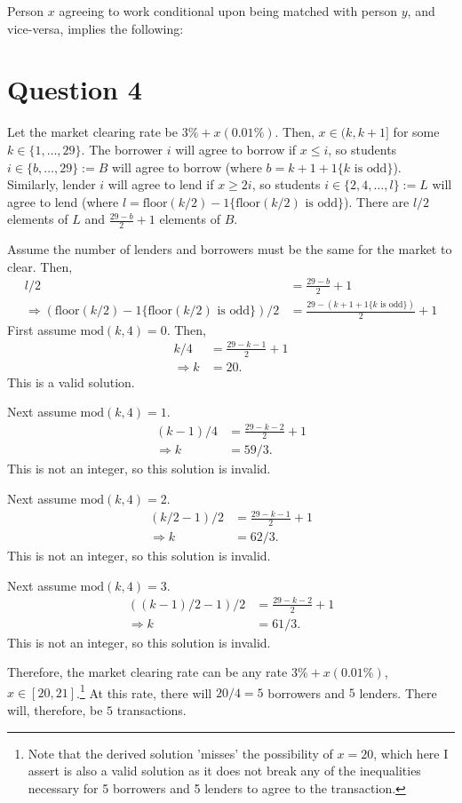 \documentclass[11pt]{article} %
\begin{document}
Person $x$ agreeing to work conditional upon being matched with person $y$, and vice-versa, implies the following:


\section{Question 4}
Let the market clearing rate be  $3\%+x(0.01\%)$. Then, $x\in (k,k+1]$ for some $k \in \{1,\dots,29\}$. The borrower $i$ will agree to borrow if $x\leq i$, so students $i \in \{b, \dots, 29\}:= B$ will agree to borrow (where $b= k +1 + 1\{k \text{ is odd}\}$). Similarly, lender $i$ will agree to lend if $x\geq 2i$, so students $i \in \{2,4,\dots,l\}:= L$ will agree to lend (where $l = \text{floor}(k/2) - 1\{ \text{floor}(k/2) \text{ is odd}\}$). There are $l/2$ elements of $L$ and $\frac{29-b}{2} + 1$ elements of $B$.

Assume the number of lenders and borrowers must be the same for the market to clear. Then,
\begin{align*}
l/2 &= \frac{29-b}{2} + 1\\
\Rightarrow  ( \text{floor}(k/2) - 1\{ \text{floor}(k/2) \text{ is odd}\})/2 &=  \frac{29-(k +1 + 1\{k \text{ is odd}\})}{2} + 1
\end{align*}
First assume $\text{mod}(k,4) = 0.$ Then, 
\begin{align*}
k/4 &= \frac{29 - k - 1}{2}+1\\
\Rightarrow k &= 20.
\end{align*}
This is a valid solution.

Next assume $\text{mod}(k,4) = 1$.
\begin{align*}
(k-1)/4 &= \frac{29 - k - 2}{2} +1\\
\Rightarrow k&= 59/3.
\end{align*}
This is not an integer, so this solution is invalid.

Next assume $\text{mod}(k,4) = 2$.
\begin{align*}
(k/2 - 1)/2 &= \frac{29 - k - 1}{2} +1\\
\Rightarrow k&= 62/3.
\end{align*}
This is not an integer, so this solution is invalid.

Next assume $\text{mod}(k,4) = 3$.
\begin{align*}
((k-1)/2 -1)/2 &= \frac{29 - k - 2}{2} +1\\
\Rightarrow k &= 61/3.
\end{align*}
This is not an integer, so this solution is invalid.

Therefore, the market clearing rate can be any rate $3\%+x(0.01\%)$, $x \in [20,21]$.\footnote{Note that the derived solution 'misses' the possibility of $x=20$, which here I assert is also a valid solution as it does not break any of the inequalities necessary for 5 borrowers and 5 lenders to agree to the transaction.} At this rate, there will $20/4 = 5$ borrowers and $5$ lenders. There will, therefore, be $5$ transactions.
\end{document}
